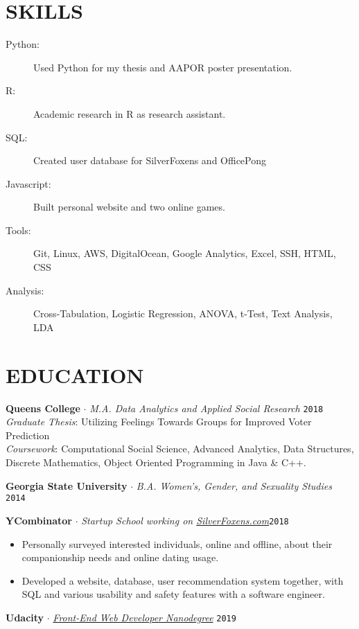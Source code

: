 \documentclass[margin, line, 11pt]{res}
\begin{document}
\begin{resume}
\section{SKILLS}
\begin{description}
\item[Python:] Used Python for my thesis and AAPOR poster presentation.
\item[R:] Academic research in R as research assistant.
\item[SQL:] Created user database for SilverFoxens and OfficePong
\item[Javascript:] Built personal website and two online games. 
\item[Tools:] Git, Linux, AWS, DigitalOcean, Google Analytics, Excel, SSH, HTML, CSS
\item[Analysis:] Cross-Tabulation, Logistic Regression, ANOVA, t-Test, Text Analysis, LDA
\end{description}

\section{EDUCATION}

{\bf Queens College} $\cdot$ {\it M.A. Data Analytics and Applied Social Research} \hfill \texttt{2018}
\\{\it Graduate Thesis}: Utilizing Feelings Towards Groups for Improved Voter Prediction
\\{\it Coursework}: Computational Social Science, Advanced Analytics, Data Structures, Discrete 
Mathematics, Object Oriented Programming in Java \& C++.

{\bf Georgia State University} $\cdot$ {\it B.A. Women's, Gender, and Sexuality Studies} \hfill \texttt{2014}

{\bf YCombinator} $\cdot$ {\it Startup School working on \href{http://silverfoxens.com}{SilverFoxens.com}}\hfill \texttt{2018}

\begin{itemize}
 \item Personally surveyed interested individuals, online and offline, about their companionship needs and online dating usage.
 \item Developed a website, database, user recommendation system together, with SQL and various usability and safety features with a software engineer.
\end{itemize}

{\bf Udacity} $\cdot$ {\it \href{https://confirm.udacity.com/VUHFGNF6}{Front-End Web Developer Nanodegree}} \hfill \texttt{2019}

\end{resume}
\end{document}

